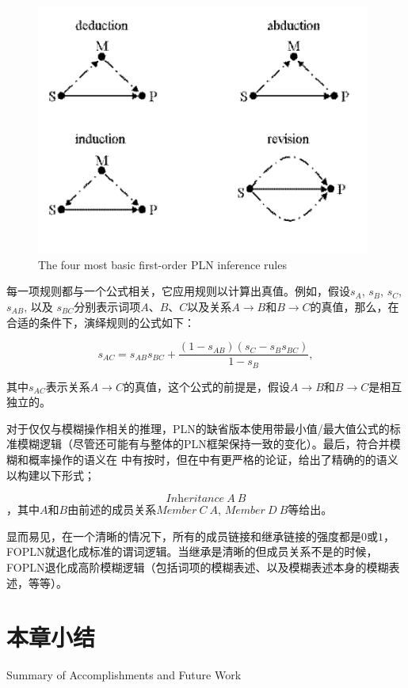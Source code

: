 \begin{figure}[htb]
  \center
  \includegraphics[width=11cm]{figures/inference.png}
  \caption{The four most basic first-order PLN inference rules}
  \label{fig:inference}
\end{figure}

每一项规则都与一个公式相关，它应用规则以计算出真值。例如，假设$s_A$, $s_B$, $s_C$, $s_{AB}$, 以及 $s_{BC}$分别表示词项$A$、$B$、$C$以及关系$A\rightarrow B$和$B\rightarrow C$的真值，那么，在合适的条件下，演绎规则的公式如下：

$$s_{AC}=s_{AB}s_{BC}+\frac{\left(1-s_{AB}\right)\left(s_C-s_Bs_{BC}\right)}{1-s_B},$$

其中$s_{AC}$表示关系$A\rightarrow C$的真值，这个公式的前提是，假设$A\rightarrow B$和$B\rightarrow C$是相互独立的。

对于仅仅与模糊操作相关的推理，PLN的缺省版本使用带最小值/最大值公式的标准模糊逻辑（尽管还可能有与整体的PLN框架保持一致的变化）。最后，符合并模糊和概率操作的语义在\cite{Goertzel2008} 中有按时，但在\cite{Goertzel2010e}中有更严格的论证，给出了精确的的语义以构建以下形式；

$$
\textit{Inheritance} \ A \  B
$$，其中$A$和$B$由前述的成员关系$\textit{Member}\ C\ A$, $\textit{Member}\ D\ B$等给出。

显而易见，在一个清晰的情况下，所有的成员链接和继承链接的强度都是$0$或$1$，FOPLN就退化成标准的谓词逻辑。当继承是清晰的但成员关系不是的时候，FOPLN退化成高阶模糊逻辑（包括词项的模糊表述、以及模糊表述本身的模糊表述，等等）。




\section{本章小结}{Summary of Accomplishments and Future Work}
